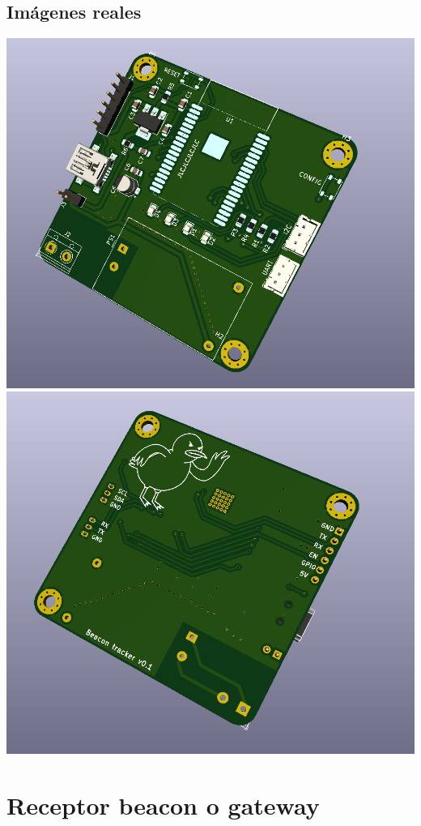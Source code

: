 \documentclass[a4paper ,12pt, onecolumn]{article}
\begin{document}
    \subsection{Imágenes reales}
        \includegraphics[scale=0.2]{../receiver_1.PNG}
        \includegraphics[scale=0.2]{../receiver_2.PNG}

\section{Receptor beacon o gateway}
\end{document}
